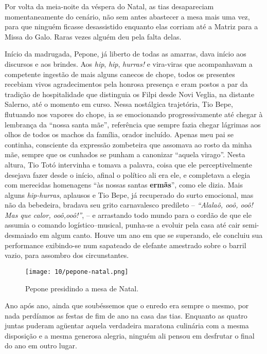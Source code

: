 Por volta da meia-noite da véspera do Natal, as tias desapareciam momentaneamente do cenário, não sem antes abastecer a mesa mais uma vez, para que ninguém ficasse desassistido enquanto elas corriam até a Matriz para a Missa do Galo.
Raras vezes alguém deu pela falta delas.


Início da madrugada, Pepone, já liberto de todas as amarras, dava início aos discursos e aos brindes.
Aos \textit{hip}, \textit{hip}, \textit{hurras!} e vira-viras que acompanhavam a competente ingestão de mais alguns canecos de chope, todos os presentes recebiam vivos agradecimentos pela honrosa presença e eram postos a par da tradição de hospitalidade que distinguia os Filpi desde Novi Veglia, na distante Salerno, até o momento em curso.
Nessa nostálgica trajetória, Tio Bepe, flutuando nos vapores do chope, ia se emocionando progressivamente até chegar à lembrança da ``nossa santa mãe'', referência que sempre fazia chegar lágrimas aos olhos de todos os machos da família, orador incluído.
Apenas meu pai se continha, consciente da expressão zombeteira que assomava ao rosto da minha mãe, sempre que os cunhados se punham a canonizar ``aquela virago''.
Nesta altura, Tio Totó intervinha e tomava a palavra, coisa que ele perceptivelmente desejava fazer desde o início, afinal o político ali era ele, e completava a elegia com merecidas homenagens ``às nossas santas {\large\bfseries ermãs}'', como ele dizia.
Mais alguns \textit{hip-hurras}, aplausos e Tio Bepe, já recuperado do surto emocional, mas não da bebedeira, bradava seu grito carnavalesco predileto -- \textit{“Alalaô, ooô, ooô! Mas que calor, ooô,ooô!”}, -- e arrastando todo mundo para o cordão de que ele assumia o comando logístico–musical, punha-se a evoluir pela casa até cair semi-desmaiado em algum canto.
Houve um ano em que se superando, ele concluiu sua performance exibindo-se num sapateado de elefante amestrado sobre o barril vazio, para assombro dos circunstantes.


\begin{figure}[H]
\centering
\texttt{[image: 10/pepone-natal.png]}
\caption{Pepone presidindo a mesa de Natal.}
\end{figure}

Ano após ano, ainda que soubéssemos que o enredo era sempre o mesmo, por nada perdíamos as festas de fim de ano na casa das tias.
Enquanto as quatro juntas puderam agüentar aquela verdadeira maratona culinária com a mesma disposição e a mesma generosa alegria, ninguém ali pensou em desfrutar o final do ano em outro lugar.

